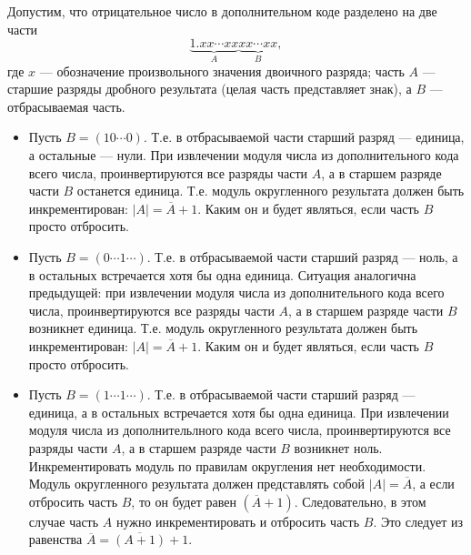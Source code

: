 Допустим, что отрицательное число в дополнительном коде разделено на две части
\[
    \underbrace{1.xx\cdots xx}_A\underbrace{xx\cdots xx}_B,
\]
где $x$ --- обозначение произвольного значения двоичного разряда; часть $A$ --- старшие разряды дробного результата (целая часть представляет знак), а $B$ --- отбрасываемая часть.

\begin{itemize}
    \item Пусть $B=(10\cdots 0)$. Т.е. в отбрасываемой части старший разряд --- единица, а остальные --- нули. При извлечении модуля числа из дополнительного кода всего числа, проинвертируются все разряды части $A$, а в старшем разряде части $B$ останется единица. Т.е. модуль округленного результата должен быть инкрементирован: $|A| = \overline{A} + 1$. Каким он и будет являться, если часть $B$ просто отбросить.
    
    \item Пусть $B=(0\cdots 1\cdots)$. Т.е. в отбрасываемой части старший разряд --- ноль, а в остальных встречается хотя бы одна единица. Ситуация аналогична предыдущей: при извлечении модуля числа из дополнительного кода всего числа, проинвертируются все разряды части $A$, а в старшем разряде части $B$ возникнет единица. Т.е. модуль округленного результата должен быть инкрементирован: $|A| = \overline{A} + 1$. Каким он и будет являться, если часть $B$ просто отбросить.
    
    \item Пусть $B=(1\cdots 1\cdots)$. Т.е. в отбрасываемой части старший разряд --- единица, а в остальных встречается хотя бы одна единица. При извлечении модуля числа из дополнительлного кода всего числа, проинвертируются все разряды части $A$, а в старшем разряде части $B$ возникнет ноль. Инкрементировать модуль по правилам округления нет необходимости. Модуль округленного результата должен представлять собой $|A| = \overline{A}$, а если отбросить часть $B$, то он будет равен $(\overline{A} + 1)$. Следовательно, в этом случае часть $A$ нужно инкрементировать и отбросить часть $B$. Это следует из равенства $\overline{A}=\overline{(A + 1)} + 1$.
\end{itemize}

